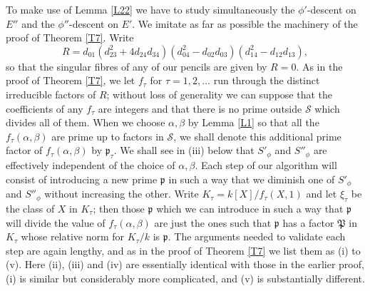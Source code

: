 \documentclass[12pt]{article}
\def\fp{{\mathfrak p}}
\def\fP{{\mathfrak P}}
\def\ga{{\alpha}}
\def\gb{{\beta}}
\def\sS{{\mathcal S}}
\begin{document}
To make use of Lemma \ref{L22} we have to study simultaneously
the $\phi'$-descent on $E''$ and the $\phi''$-descent on $E'$.
We imitate
as far as possible the machinery of the proof of Theorem
\ref{T7}. Write
\[ R=d_{01}(d_{23}^2+4d_{24}d_{34})(d_{04}^2-d_{02}d_{03})
(d_{14}^2-d_{12}d_{13}), \]
so that the singular fibres of any of our pencils are given by
$R=0$. As in the proof of Theorem \ref{T7}, we let $f_\tau$
for $\tau=1,2,\ldots$ run through the distinct irreducible
factors of $R$; without loss of generality we can suppose that
the coefficients of any $f_\tau$ are integers and that there
is no prime outside $\sS$ which divides all of them. When we
choose $\ga,\gb$ by Lemma \ref{L1} so that all the
$f_\tau(\ga,\gb)$ are prime up to factors in $\sS$, we shall
denote this additional prime factor of $f_\tau(\ga,\gb)$ by
$\fp_\tau$. We shall see in (iii) below that $S'_\phi$ and
$S''_\phi$ are
effectively independent of the choice of $\ga,\gb$. Each step
of our algorithm will consist of introducing a new prime
$\fp$ in such a way that we diminish one of $S'_\phi$ and
$S''_\phi$ without increasing the other. Write
$K_\tau=k[X]/f_\tau(X,1)$ and let $\xi_\tau$ be the class of
$X$ in $K_\tau$; then those $\fp$ which we can introduce in
such a way that $\fp$ will divide the value of
$f_\tau(\ga,\gb)$ are just the ones such that
$\fp$ has a factor $\fP$ in $K_\tau$ whose relative norm for
$K_\tau/k$ is $\fp$. The arguments needed to validate each
step are again lengthy, and as in the proof of Theorem
\ref{T7} we list them as (i) to (v). Here (ii), (iii) and (iv)
are essentially identical with those in the earlier proof, (i)
is similar but considerably more complicated, and (v) is
substantially different.

\medskip
\end{document}
